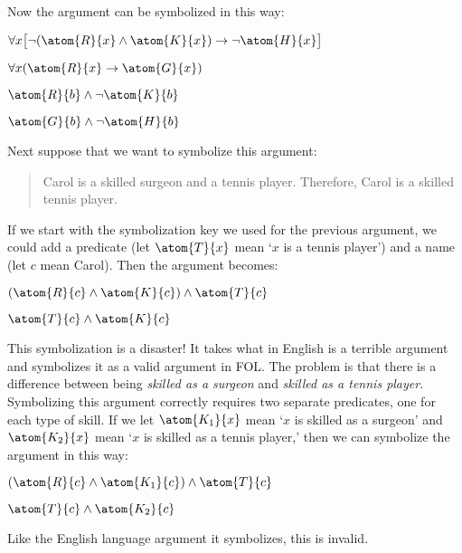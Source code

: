 Now the argument can be symbolized in this way:
\begin{earg}
\label{surgeon2}
\item[] $\forall x\bigl[\enot (\atom{R}{x} \eand \atom{K}{x}) \eif \enot \atom{H}{x}\bigr]$
\item[] $\forall x(\atom{R}{x} \eif \atom{G}{x})$
\item[] $\atom{R}{b} \eand \enot \atom{K}{b}$
\item[\therefore] $\atom{G}{b} \eand \enot \atom{H}{b}$
\end{earg}

Next suppose that we want to symbolize this argument:
\begin{quote}
\label{surgeon3}
Carol is a skilled surgeon and a tennis player. Therefore, Carol is a skilled tennis player.
\end{quote}
If we start with the symbolization key we used for the previous argument, we could add a predicate (let $\atom{T}{x}$ mean `$x$ is a tennis player') and a name (let $c$ mean Carol). Then the argument becomes:
\begin{earg}
\item[] $(\atom{R}{c} \eand \atom{K}{c}) \eand \atom{T}{c}$
\item[\therefore] $\atom{T}{c} \eand \atom{K}{c}$
\end{earg}
This symbolization is a disaster! It takes what in English is a terrible argument and symbolizes it as a valid argument in FOL. The problem is that there is a difference between being \emph{skilled as a surgeon} and \emph{skilled as a tennis player}. Symbolizing this argument correctly requires two separate predicates, one for each type of skill. If we let $\atom{K_1}{x}$ mean `$x$ is skilled as a surgeon' and $\atom{K_2}{x}$ mean `$x$ is skilled as a tennis player,' then we can symbolize the argument in this way:
\begin{earg}
\label{surgeon3correct}
\item[] $(\atom{R}{c} \eand \atom{K_1}{c}) \eand \atom{T}{c}$
\item[\therefore] $\atom{T}{c} \eand \atom{K_2}{c}$
\end{earg}
Like the English language argument it symbolizes, this is invalid. %

